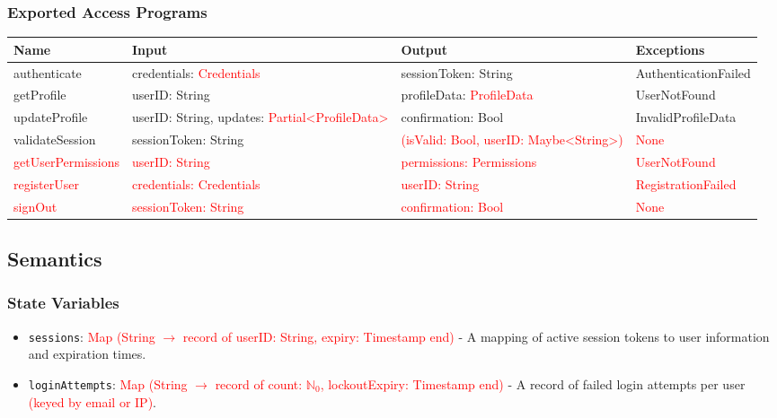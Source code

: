 \documentclass[12pt, titlepage]{article}
\begin{document}
\subsubsection{Exported Access Programs}
\begin{center}
    \scriptsize
    \begin{tabular}{|p{3cm}|p{4cm}|p{4cm}|p{4cm}|}
        \hline
        \textbf{Name} & \textbf{Input} & \textbf{Output} & \textbf{Exceptions} \\
        \hline
        authenticate & credentials: \textcolor{red}{Credentials} & sessionToken: String & AuthenticationFailed \\
        \hline
        getProfile & userID: String & profileData: \textcolor{red}{ProfileData} & UserNotFound \\
        \hline
        updateProfile & userID: String, updates: \textcolor{red}{Partial<ProfileData>} & confirmation: Bool & InvalidProfileData \\
        \hline
        validateSession & sessionToken: String & \textcolor{red}{(isValid: Bool, userID: Maybe<String>)} & \textcolor{red}{None} \\ %
        \hline
        \textcolor{red}{getUserPermissions} & \textcolor{red}{userID: String} & \textcolor{red}{permissions: Permissions} & \textcolor{red}{UserNotFound} \\
        \hline
        \textcolor{red}{registerUser} & \textcolor{red}{credentials: Credentials} & \textcolor{red}{userID: String} & \textcolor{red}{RegistrationFailed} \\
        \hline
        \textcolor{red}{signOut} & \textcolor{red}{sessionToken: String} & \textcolor{red}{confirmation: Bool} & \textcolor{red}{None} \\ %
        \hline
    \end{tabular}
\end{center}

\subsection{Semantics}
\subsubsection{State Variables}
\begin{itemize}
    \item \texttt{sessions}: \textcolor{red}{Map (String $\rightarrow$ record of userID: String, expiry: Timestamp end)} - A mapping of active session tokens to user information and expiration times.
    \item \texttt{loginAttempts}: \textcolor{red}{Map (String $\rightarrow$ record of count: $\mathbb{N}_0$, lockoutExpiry: Timestamp end)} - A record of failed login attempts per user \textcolor{red}{(keyed by email or IP)}.
\end{itemize}
\end{document}
